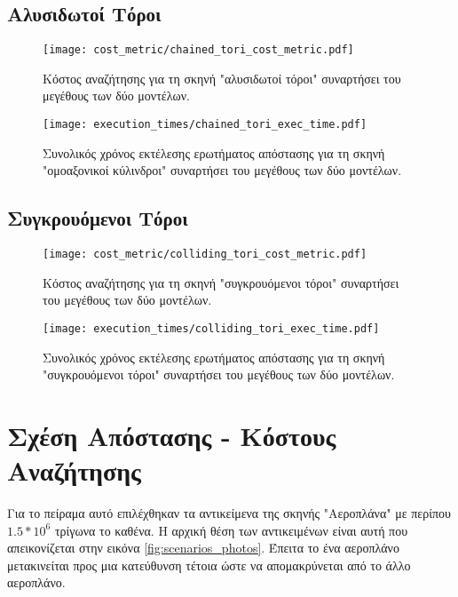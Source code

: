 \subsection{Αλυσιδωτοί Τόροι}
\begin{figure}[H]
    \centering
    \texttt{[image: cost\_metric/chained\_tori\_cost\_metric.pdf]}
    \caption[Κόστος Αναζήτησης για "αλυσιδωτοί τόροι"] {
        Κόστος αναζήτησης για τη σκηνή "αλυσιδωτοί τόροι" συναρτήσει 
        του μεγέθους των δύο μοντέλων.
    }
\end{figure}

\begin{figure}[H]
    \centering
    \texttt{[image: execution\_times/chained\_tori\_exec\_time.pdf]}
    \caption[Συνολικός Χρόνος Εκτέλεσης για "ομοαξονικοί κύλινδροι"] {
        Συνολικός χρόνος εκτέλεσης ερωτήματος απόστασης 
        για τη σκηνή "ομοαξονικοί κύλινδροι" συναρτήσει του μεγέθους των δύο μοντέλων.
    }
\end{figure}

\subsection{Συγκρουόμενοι Τόροι}
\begin{figure}[H]
    \centering
    \texttt{[image: cost\_metric/colliding\_tori\_cost\_metric.pdf]}
    \caption[Κόστος Αναζήτησης για "συγκρουόμενοι τόροι"] {
        Κόστος αναζήτησης για τη σκηνή "συγκρουόμενοι τόροι" συναρτήσει 
        του μεγέθους των δύο μοντέλων.
    }
\end{figure}

\begin{figure}[H]
    \centering
    \texttt{[image: execution\_times/colliding\_tori\_exec\_time.pdf]}
    \caption[Συνολικός Χρόνος Εκτέλεσης για "συγκρουόμενοι τόροι"] {
        Συνολικός χρόνος εκτέλεσης ερωτήματος απόστασης 
        για τη σκηνή "συγκρουόμενοι τόροι" συναρτήσει του μεγέθους των δύο μοντέλων.
    }
\end{figure}


\section{Σχέση Απόστασης - Κόστους Αναζήτησης}
\label{sec:dist_vs_cost}
Για το πείραμα αυτό επιλέχθηκαν τα αντικείμενα της σκηνής 
"Αεροπλάνα" με περίπου $1.5 * 10^6$ τρίγωνα το καθένα.
Η αρχική θέση των αντικειμένων είναι αυτή που απεικονίζεται 
στην εικόνα \ref{fig:scenarios_photos}.
Έπειτα το ένα αεροπλάνο μετακινείται 
προς μια κατεύθυνση τέτοια ώστε να απομακρύνεται 
από το άλλο αεροπλάνο.


